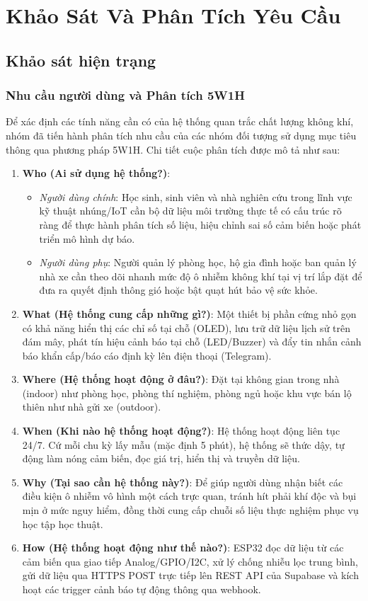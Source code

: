 \chapter{Khảo Sát Và Phân Tích Yêu Cầu}

\section{Khảo sát hiện trạng}
\subsection{Nhu cầu người dùng và Phân tích 5W1H}
Để xác định các tính năng cần có của hệ thống quan trắc chất lượng không khí, nhóm đã tiến hành phân tích nhu cầu của các nhóm đối tượng sử dụng mục tiêu thông qua phương pháp 5W1H. Chi tiết cuộc phân tích được mô tả như sau:
\begin{enumerate}
    \item \textbf{Who (Ai sử dụng hệ thống?)}: 
    \begin{itemize}
        \item \textit{Người dùng chính}: Học sinh, sinh viên và nhà nghiên cứu trong lĩnh vực kỹ thuật nhúng/IoT cần bộ dữ liệu môi trường thực tế có cấu trúc rõ ràng để thực hành phân tích số liệu, hiệu chỉnh sai số cảm biến hoặc phát triển mô hình dự báo.
        \item \textit{Người dùng phụ}: Người quản lý phòng học, hộ gia đình hoặc ban quản lý nhà xe cần theo dõi nhanh mức độ ô nhiễm không khí tại vị trí lắp đặt để đưa ra quyết định thông gió hoặc bật quạt hút bảo vệ sức khỏe.
    \end{itemize}
    \item \textbf{What (Hệ thống cung cấp những gì?)}: Một thiết bị phần cứng nhỏ gọn có khả năng hiển thị các chỉ số tại chỗ (OLED), lưu trữ dữ liệu lịch sử trên đám mây, phát tín hiệu cảnh báo tại chỗ (LED/Buzzer) và đẩy tin nhắn cảnh báo khẩn cấp/báo cáo định kỳ lên điện thoại (Telegram).
    \item \textbf{Where (Hệ thống hoạt động ở đâu?)}: Đặt tại không gian trong nhà (indoor) như phòng học, phòng thí nghiệm, phòng ngủ hoặc khu vực bán lộ thiên như nhà gửi xe (outdoor).
    \item \textbf{When (Khi nào hệ thống hoạt động?)}: Hệ thống hoạt động liên tục 24/7. Cứ mỗi chu kỳ lấy mẫu (mặc định 5 phút), hệ thống sẽ thức dậy, tự động làm nóng cảm biến, đọc giá trị, hiển thị và truyền dữ liệu.
    \item \textbf{Why (Tại sao cần hệ thống này?)}: Để giúp người dùng nhận biết các điều kiện ô nhiễm vô hình một cách trực quan, tránh hít phải khí độc và bụi mịn ở mức nguy hiểm, đồng thời cung cấp chuỗi số liệu thực nghiệm phục vụ học tập học thuật.
    \item \textbf{How (Hệ thống hoạt động như thế nào?)}: ESP32 đọc dữ liệu từ các cảm biến qua giao tiếp Analog/GPIO/I2C, xử lý chống nhiễu lọc trung bình, gửi dữ liệu qua HTTPS POST trực tiếp lên REST API của Supabase và kích hoạt các trigger cảnh báo tự động thông qua webhook.
\end{enumerate}

